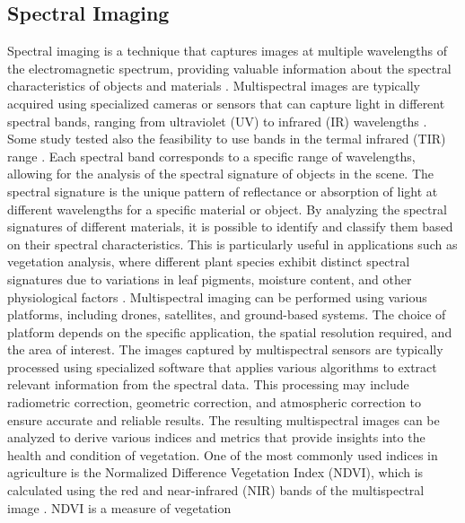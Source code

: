 \documentclass[12pt,a4paper,oneside]{report}
\begin{document}
\subsection{Spectral Imaging}
Spectral imaging is a technique that captures images at multiple wavelengths
of the electromagnetic spectrum, providing valuable information about the spectral
characteristics of objects and materials
\cite{meerImagingSpectrometryBasic2001,thenkabailHyperspectralRemoteSensing2016}. 
Multispectral images are typically acquired using specialized
cameras or sensors that can capture light in different spectral bands, ranging
from ultraviolet (UV) to infrared (IR) wavelengths
\cite{thenkabailHyperspectralRemoteSensing2016,mahleinHyperspectralSensorsImaging2018}. 
Some study tested also the 
feasibility to use bands in the termal infrared (TIR) range \cite{wanOptimizingUAVbasedUncooled2024}.
Each spectral band corresponds
to a specific range of wavelengths, allowing for the analysis of the spectral
signature of objects in the scene.
The spectral signature is the unique pattern of reflectance or absorption of
light at different wavelengths for a specific material or object. By analyzing
the spectral signatures of different materials, it is possible to identify and
classify them based on their spectral characteristics. This is particularly useful
in applications such as vegetation analysis, where different plant species exhibit
distinct spectral signatures due to variations in leaf pigments, moisture content,
and other physiological factors
\cite{sarviaGeometricVsSpectral2024}.
Multispectral imaging can be performed using various platforms, including
drones, satellites, and ground-based systems. The choice of platform depends on
the specific application, the spatial resolution required, and the area of interest.
The images captured by multispectral sensors are typically processed using
specialized software that applies various algorithms to extract relevant information
from the spectral data. This processing may include radiometric correction,
geometric correction, and atmospheric correction to ensure accurate and reliable
results.
The resulting multispectral images can be analyzed to derive various indices
and metrics that provide insights into the health and condition of vegetation.
One of the most commonly used indices in agriculture is the Normalized Difference
Vegetation Index (NDVI), which is calculated using the red and near-infrared
(NIR) bands of the multispectral image \cite{rouseMonitoringVegetationSystems1974,tuckerRedPhotographicInfrared1979}. 
NDVI is a measure of vegetation
\end{document}
